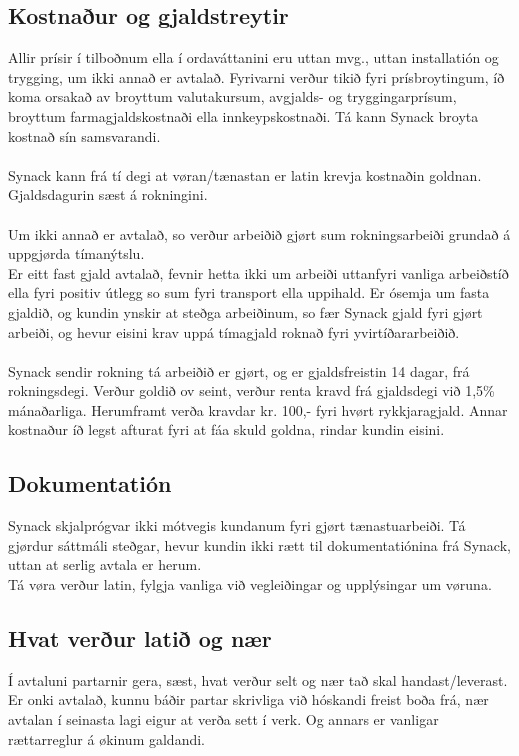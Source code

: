 \subsection{Kostnaður og gjaldstreytir}
Allir prísir í tilboðnum ella í ordaváttanini eru uttan mvg., uttan installatión og trygging, um ikki annað er avtalað. Fyrivarni verður tikið fyri prísbroytingum, íð koma orsakað av broyttum valutakursum, avgjalds- og tryggingarprísum, broyttum farmagjaldskostnaði ella innkeypskostnaði. Tá kann Synack broyta kostnað sín samsvarandi. \\ \\
Synack kann frá tí degi at vøran/tænastan er latin krevja kostnaðin goldnan. Gjaldsdagurin sæst á rokningini. \\ \\
Um ikki annað er avtalað, so verður arbeiðið gjørt sum rokningsarbeiði grundað á uppgjørda tímanýtslu. \\
Er eitt fast gjald avtalað, fevnir hetta ikki um arbeiði uttanfyri vanliga arbeiðstíð ella fyri positiv útlegg so sum fyri transport ella uppihald. Er ósemja um fasta gjaldið, og kundin ynskir at steðga arbeiðinum, so fær Synack gjald fyri gjørt arbeiði, og hevur eisini krav uppá tímagjald roknað fyri yvirtíðararbeiðið. \\ \\
Synack sendir rokning tá arbeiðið er gjørt, og er gjaldsfreistin 14 dagar, frá rokningsdegi. Verður goldið ov seint, verður renta kravd frá gjaldsdegi við 1,5\% mánaðarliga. Herumframt verða kravdar kr. 100,- fyri hvørt rykkjaragjald. Annar kostnaður íð legst afturat fyri at fáa skuld goldna, rindar kundin eisini.

\subsection{Dokumentatión}
Synack skjalprógvar ikki mótvegis kundanum fyri gjørt tænastuarbeiði. Tá gjørdur sáttmáli steðgar, hevur kundin ikki rætt til dokumentatiónina frá Synack, uttan at serlig avtala er herum. \\
Tá vøra verður latin, fylgja vanliga við vegleiðingar og upplýsingar um vøruna.

\subsection{Hvat verður latið og nær}
Í avtaluni partarnir gera, sæst, hvat verður selt og nær tað skal handast/leverast. Er onki avtalað, kunnu báðir partar skrivliga við hóskandi freist boða frá, nær avtalan í seinasta lagi eigur at verða sett í verk. Og annars er vanligar rættarreglur á økinum galdandi.

